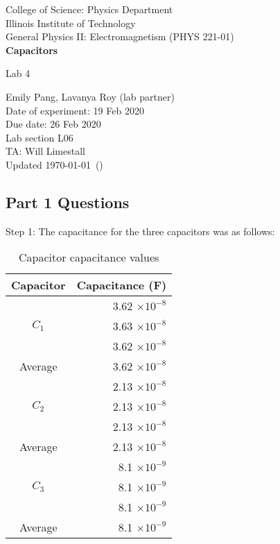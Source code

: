 \documentclass [12pt, letterpaper, twoside] {article}
\begin{document}
\begin {titlepage}
\begin {center}
College of Science: Physics Department \\
\vspace {0.1cm}
Illinois Institute of Technology \\
\vspace {0.1cm}
General Physics II: Electromagnetism (PHYS 221-01) \\
\vspace* {\fill}
\begingroup
\Large
\textbf {Capacitors}
\vspace {0.35cm}

\normalsize
Lab 4
\vspace {1.5cm}
\endgroup
\vspace* {\fill}
\end {center}

\vspace*{\fill}
\begin {flushright}
\footnotesize
Emily Pang, Lavanya Roy (lab partner) \\
Date of experiment: 19 Feb 2020 \\
Due date: 26 Feb 2020 \\
Lab section L06 \\
TA: Will Limestall \\
Updated \usdate\today~(\currenttime)
\end {flushright}
\end {titlepage}

\subsection* {Part 1 Questions}
Step 1:
The capacitance for the three capacitors was as follows:

\begin{table}[h!]
  \centering
  \begin{tabular}{| c | r |}
    \hline\hline
    Capacitor & Capacitance (F) \\
    \hline
    \multirow {3}{*}{\(C_{1}\)} & 3.62 \(\times{10}^{-8}\) \\
    & 3.63 \(\times{10}^{-8}\) \\
    & 3.62 \(\times{10}^{-8}\) \\
    \hline
    Average & 3.62 \(\times{10}^{-8}\) \\ %
    \hline
    \multirow {3}{*}{\(C_{2}\)} & 2.13 \(\times{10}^{-8}\) \\
    & 2.13 \(\times{10}^{-8}\) \\
    & 2.13 \(\times{10}^{-8}\) \\
    \hline
    Average & 2.13 \(\times{10}^{-8}\) \\
    \hline
    \multirow {3}{*}{\(C_{3}\)} & 8.1 \(\times{10}^{-9}\) \\
    & 8.1 \(\times{10}^{-9}\) \\
    & 8.1 \(\times{10}^{-9}\) \\
    \hline
    Average & 8.1 \(\times{10}^{-9}\) \\
    \hline\hline
  \end{tabular}
  \caption{Capacitor capacitance values}
\end{table}
\end{document}
